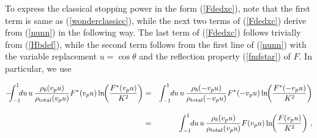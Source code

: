 \documentclass[preprint,12pt,eqsecnum,nofootinbib,amsmath,amssymb]{revtex4}
\begin{document}
\noindent
To express the classical stopping power in the form 
(\ref{Fdedxc}), note that the
first term is same as (\ref{wonderclassicc}), while
the next two terms of (\ref{Fdedxc}) derive from 
(\ref{nunn}) in the following way. The last term of 
(\ref{Fdedxc}) follows trivially from (\ref{Hbdef}),
while the second term follows from the first line of 
(\ref{nunn}) with the variable replacement $u=\cos\theta$
and the reflection property (\ref{fmfstar}) of $F$. In
particular, we use

\vbox{
\begin{eqnarray}
\nonumber
  -\hskip-0.2cm \int_{-1}^1 \hskip-0.15cm
  du \,u\, \frac{\rho_b(v_p u)}
  {\rho_{\rm total}(v_p u)} F^*(v_p u)
  \ln \hskip-0.1cm \left( \frac{ F^*(v_p u)}{K^2} \right) 
&=&
\nonumber
  \int_{-1}^1 \hskip-0.1cm du \,u\, \frac{\rho_b(-v_p u)}
  {\rho_{\rm total}(-v_p u)} F^*(-v_p u)
  \ln \hskip-0.1cm \left( \frac{ F^*(-v_p u)}{K^2} \right) 
\\[10pt]
&=&
  \int_{-1}^1 \hskip-0.1cm du \,u\, \frac{\rho_b(v_p u)}
  {\rho_{\rm total}(v_p u)} F(v_p u)
  \ln \hskip-0.1cm \left( \frac{ F(v_p u)}{K^2} \right) \,,
\end{eqnarray}
}
\end{document}
